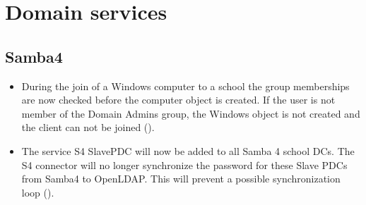 

 

\section{Domain services}

\subsection{Samba4}
\begin{itemize}
\item During the join of a Windows computer to a school the group memberships are now
 checked before the computer object is created. If the user is not member of the Domain Admins
 group, the Windows object is not created and the client can not be joined ().

\item The service S4 SlavePDC will now be added to all Samba 4 school DCs. The S4 connector will
 no longer synchronize the password for these Slave PDCs from Samba4 to OpenLDAP. This will prevent
 a possible synchronization loop ().
\end{itemize}



